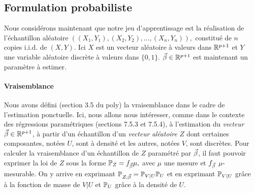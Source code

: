 \documentclass[french,11pt]{article}
\begin{document}
\subsection{Formulation probabiliste}  
Nous considérons maintenant que notre jeu d'apprentissage est la réalisation de
l'échantillon aléatoire
$\left((X_1, Y_1), (X_2, Y_2), \dots, (X_n, Y_n) \right), $ constitué de $n$
copies i.i.d. de $(X, Y)$. Ici $X$ est un vecteur aléatoire à valeurs dans
$\mathbb{R}^{p+1}$ et $Y$ une variable aléatoire discrète à valeurs dans $\{0,
1\}$. $\bbeta \in \RR^{p+1}$ est maintenant un paramètre à
estimer.


\paragraph{Vraisemblance} Nous avons défini (section 3.5 du poly) la
vraisemblance dans le cadre de l'estimation ponctuelle. Ici, nous allons nous
intéresser, comme dans le contexte des régressions paramétriques (sections
7.5.3 et 7.5.4), à l'estimation du \textit{vecteur} $\bbeta \in \RR^{p+1}$, à
partir d'un échantillon d'un \textit{vecteur aléatoire} $Z$ dont certaines
composantes, notées $U$, sont à densité et les autres, notées $V$, sont
discrètes. Pour calculer la vraisemblance d'un échantillon de $Z$ paramétré par
$\bbeta$, il faut pouvoir exprimer la loi de $Z$ sous la forme
$\PP_Z = f_{\bbeta} \mu,$ avec $\mu$ une mesure et $f_{\bbeta}$
$\mu$-mesurable. On y arrive en exprimant $\PP_{Z;\bbeta} = \PP_{V|U} \PP_U$ et
en exprimant $\mathbb{P}_{V|U}$ grâce à la fonction de masse de $V|U$ et $\mathbb{P}_U$ grâce
à la densité de $U$.
\end{document}
